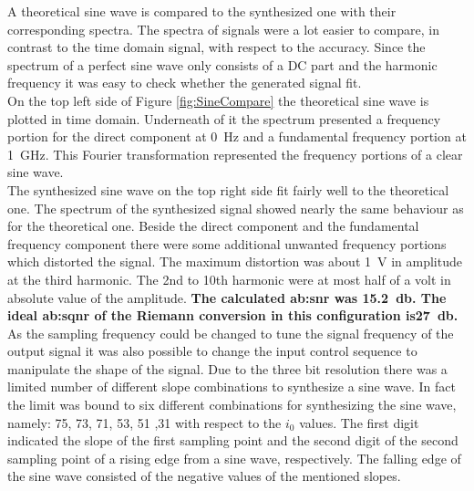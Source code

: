 A theoretical sine wave is compared to the synthesized one with their corresponding spectra.
The spectra of signals were a lot easier to compare, in contrast to the time domain signal, with respect to the accuracy.
Since the spectrum of a perfect sine wave only consists of a DC part and the harmonic frequency it was easy to check whether the generated signal fit.\\
On the top left side of Figure \ref{fig:SineCompare} the theoretical sine wave is plotted in time domain. Underneath of it the spectrum presented a frequency portion for the direct component at \SI{0} {\Hz} and a fundamental frequency portion at \SI{1}{\GHz}.
This Fourier transformation represented the frequency portions of a clear sine wave.\\
The synthesized sine wave on the top right side fit fairly well to the theoretical one.
The spectrum of the synthesized signal showed nearly the same behaviour as for the theoretical one.
Beside the direct component and the fundamental frequency component there were some additional unwanted frequency portions which distorted the signal.
The maximum distortion was about \SI{1}{\volt} in amplitude at the third harmonic.
 The 2nd to 10th harmonic were at most half of a volt in absolute value of the amplitude.
 \textbf{The calculated \gls{ab:snr} was \SI{15.2}{\decibel}.
 The ideal \gls{ab:sqnr} of the Riemann conversion in this configuration is\SI{27}{\decibel}.}\\
As the sampling frequency could be changed to tune the signal frequency of the output signal it was also possible to change the input control sequence to manipulate the shape of the signal.
Due to the three bit resolution there was a limited number of different slope combinations to synthesize a sine wave.
In fact the limit was bound to six different combinations for synthesizing  the sine wave, namely: 75, 73, 71, 53, 51 ,31 with respect to the $i_0$ values.
The first digit indicated the slope of the first sampling point and the second digit of the second sampling point of a rising edge from a sine wave, respectively. 
The falling edge of the sine wave consisted of the negative values of the mentioned slopes.

